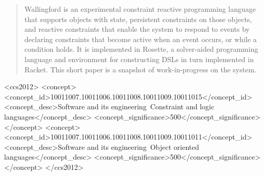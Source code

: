 \documentclass{sig-alternate-05-2015}
\begin{document}
%
\author{
%
%
\alignauthor
Alan Borning \\
\\
       \\
       \\
       \\
       \\
}

\maketitle
\begin{abstract}
Wallingford is an experimental constraint reactive programming language
that supports objects with state, persistent constraints on those objects,
and reactive constraints that enable the system to respond to events by
declaring constraints that become active when an event occurs, or while a
condition holds.  It is implemented in Rosette, a solver-aided programming
language and environment for constructing DSLs in turn implemented in
Racket.  This short paper is a snapshot of work-in-progress on the system.
\end{abstract}

%
%
\begin{CCSXML}
<ccs2012>
<concept>
<concept_id>10011007.10011006.10011008.10011009.10011015</concept_id>
<concept_desc>Software and its engineering~Constraint and logic
languages</concept_desc>
<concept_significance>500</concept_significance>
</concept>
<concept>
<concept_id>10011007.10011006.10011008.10011009.10011011</concept_id>
<concept_desc>Software and its engineering~Object oriented
languages</concept_desc>
<concept_significance>500</concept_significance>
</concept>
</ccs2012>
\end{CCSXML}
\end{document}
